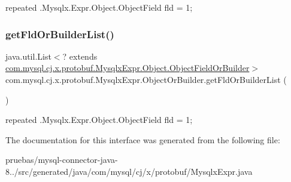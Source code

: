 {\ttfamily repeated .Mysqlx.\+Expr.\+Object.\+Object\+Field fld = 1;} \mbox{\label{interfacecom_1_1mysql_1_1cj_1_1x_1_1protobuf_1_1_mysqlx_expr_1_1_object_or_builder_ac816a83c0f742ab953fe7afb8534b20e}} 
\subsubsection{\texorpdfstring{get\+Fld\+Or\+Builder\+List()}{getFldOrBuilderList()}}
{\footnotesize\ttfamily java.\+util.\+List$<$? extends \mbox{\hyperlink{interfacecom_1_1mysql_1_1cj_1_1x_1_1protobuf_1_1_mysqlx_expr_1_1_object_1_1_object_field_or_builder}{com.\+mysql.\+cj.\+x.\+protobuf.\+Mysqlx\+Expr.\+Object.\+Object\+Field\+Or\+Builder}}$>$ com.\+mysql.\+cj.\+x.\+protobuf.\+Mysqlx\+Expr.\+Object\+Or\+Builder.\+get\+Fld\+Or\+Builder\+List (\begin{DoxyParamCaption}{ }\end{DoxyParamCaption})}

{\ttfamily repeated .Mysqlx.\+Expr.\+Object.\+Object\+Field fld = 1;} 

The documentation for this interface was generated from the following file\+:\begin{DoxyCompactItemize}
\item 
pruebas/mysql-\/connector-\/java-\/8../src/generated/java/com/mysql/cj/x/protobuf/Mysqlx\+Expr.\+java\end{DoxyCompactItemize}
